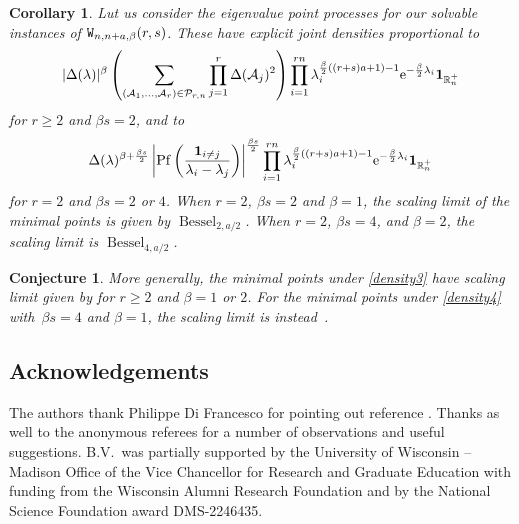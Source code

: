 \documentclass[pdftex]{sigma}
\numberwithin{equation}{section}
\newtheorem{Corollary}[Theorem]{Corollary}
\newtheorem{Conjecture}[Theorem]{Conjecture}
\theoremstyle{definition}
\newcommand{\R}{{\mathbb R}}
\newcommand{\cP}{{\mathcal P}}
\newcommand{\ind}{{\bf{1}}}
\newcommand{\Pf}{\operatorname{Pf}}
\newcommand{\cA}{\mathcal{A}}
\begin{document}
\begin{Corollary}
Lut us consider the eigenvalue point processes for our solvable instances of
${\tt{W}}_{n, n+a,\beta}(r, s)$. These have explicit joint densities proportional to
 \begin{align}
 \label{density3}
 |\Delta({\lambda})|^{\beta}
 \left( \sum_{(\mathcal{A}_1,\dots,\mathcal{A}_r)\in \cP_{r,n}} \prod_{j=1}^r \Delta(\cA_j)^2 \right) \prod_{i=1}^{rn} \lambda_i^{\frac{\beta}{2}( (r+s)a+1)-1} {\rm e}^{-\frac{\beta}{2} \lambda_i}
 \ind_{\R_n^+}
 \end{align}
for $r \ge 2$ and $\beta s=2$, and to
 \begin{align}
 \label{density4}
 \Delta({\lambda})^{\beta+\frac{\beta s}{2}} \left|\Pf \left(\frac{{\bf{1}}_{i \neq j}}{\lambda_i -\lambda_j} \right)\right|^{\frac{\beta s}{2}}
 \prod_{i=1}^{rn} \lambda_i^{\frac{\beta}{2}( (r+s) a+1)-1} {\rm e}^{-\frac{\beta}{2} \lambda_i} \ind_{\R_n^+}
 \end{align}
for $r=2$ and $\beta s =2$ or $4$. When $r=2$, $\beta s =2 $ and $\beta=1$, the scaling limit of the minimal points is given by ${\operatorname{Bessel}}_{2, a/2}$. When $r=2$, $\beta s = 4$, and $\beta = 2$, the scaling limit is $\operatorname{Bessel}_{4, a/2}$.
\end{Corollary}

\begin{Conjecture}
More generally, the minimal points under \eqref{density3} have scaling limit given by  for
$r \ge 2$ and $\beta =1$ or $2$. For the minimal points under \eqref{density4} with~${\beta s =4}$ and $\beta =1$, the scaling limit is instead~.
\end{Conjecture}








\subsection*{Acknowledgements}

The authors thank Philippe Di Francesco for pointing out reference \cite{DSZ}. Thanks as well to the anonymous referees for a number of observations and useful suggestions. B.V.~was partially supported by the University of Wisconsin – Madison Office of the Vice Chancellor for Research and Graduate Education with funding from the Wisconsin Alumni Research Foundation and by the National Science Foundation award DMS-2246435.
\end{document}
